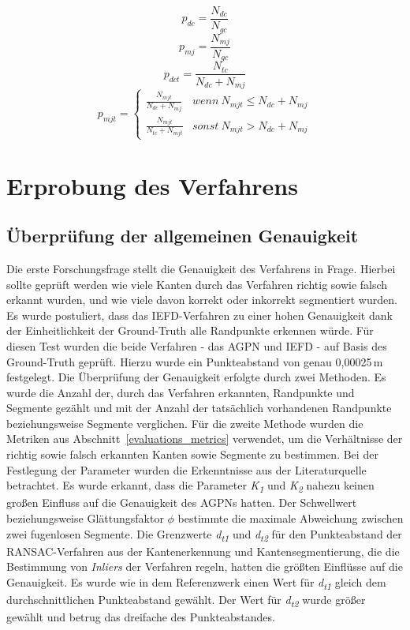 \begin{equation}
	\label{pdc}
	p_{dc} = \frac{N_{dc}}{N_{gc}}
\end{equation}
\begin{equation}
	\label{pmj}
	p_{mj} = \frac{N_{mj}}{N_{gc}}
\end{equation}
\begin{equation}
	\label{pdct}
	p_{dct} = \frac{N_{tc}}{N_{dc} + N_{mj}}
\end{equation}
\begin{equation}
	\label{pmjt}
	p_{mjt} =
	\begin{cases}
		\frac{N_{mjt}}{N_{dc} + N_{mj}} & wenn\ N_{mjt} \leq N_{dc} + N_{mj}\\
		\frac{N_{mjt}}{N_{tc} + N_{mjt}} & sonst\ N_{mjt} > N_{dc} + N_{mj}
	\end{cases}
\end{equation}

\section{Erprobung des Verfahrens}
\subsection{Überprüfung der allgemeinen Genauigkeit} \label{test_1}
Die erste Forschungsfrage stellt die Genauigkeit des Verfahrens in Frage. Hierbei sollte geprüft werden wie viele Kanten durch das Verfahren richtig sowie falsch erkannt wurden, und wie viele davon korrekt oder inkorrekt segmentiert wurden. Es wurde postuliert, dass das IEFD-Verfahren zu einer hohen Genauigkeit dank der Einheitlichkeit der Ground-Truth alle Randpunkte erkennen würde. Für diesen Test wurden die beide Verfahren - das AGPN und IEFD - auf Basis des Ground-Truth geprüft. Hierzu wurde ein Punkteabstand von genau 0,00025\,\si{\metre} festgelegt. Die Überprüfung der Genauigkeit erfolgte durch zwei Methoden. Es wurde die Anzahl der, durch das Verfahren erkannten, Randpunkte und Segmente gezählt und mit der Anzahl der tatsächlich vorhandenen Randpunkte beziehungsweise Segmente verglichen. Für die zweite Methode wurden die Metriken aus Abschnitt~\ref{evaluations_metrics} verwendet, um die Verhältnisse der richtig sowie falsch erkannten Kanten sowie Segmente zu bestimmen. Bei der Festlegung der Parameter wurden die Erkenntnisse aus der Literaturquelle betrachtet. Es wurde erkannt, dass die Parameter \textit{K\textsubscript{1}} und \textit{K\textsubscript{2}} nahezu keinen großen Einfluss auf die Genauigkeit des AGPNs hatten. Der Schwellwert beziehungsweise Glättungsfaktor $\phi$ bestimmte die maximale Abweichung zwischen zwei fugenlosen Segmente. Die Grenzwerte \textit{d\textsubscript{t1}} und \textit{d\textsubscript{t2}} für den Punkteabstand der RANSAC-Verfahren aus der Kantenerkennung und Kantensegmentierung, die die Bestimmung von \textit{Inliers} der Verfahren regeln, hatten die größten Einflüsse auf die Genauigkeit. Es wurde wie in dem Referenzwerk einen Wert für \textit{d\textsubscript{t1}} gleich dem durchschnittlichen Punkteabstand gewählt. Der Wert für \textit{d\textsubscript{t2}} wurde größer gewählt und betrug das dreifache des Punkteabstandes. \autocite[10-11]{ni_edge_2016}

